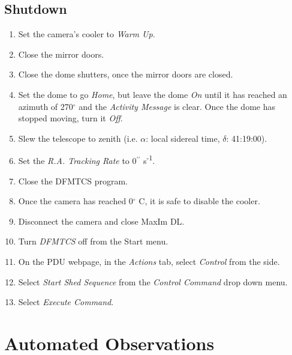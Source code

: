 \documentclass[letterpaper,12pt]{article}
\begin{document}
	\subsection{Shutdown}
	\begin{enumerate}
	\item Set the camera's  cooler to \textit{Warm Up}.
	\item Close the mirror doors.
	\item Close the dome shutters, once the mirror doors are closed.
	\item Set the dome to go \textit{Home}, but leave the dome \textit{On} until it has reached an azimuth of 270$^\circ$ and the \textit{Activity Message} is clear. Once the dome has stopped moving, turn it \textit{Off}.
	\item Slew the telescope to zenith (i.e. $\alpha$: local sidereal time, $\delta$: 41:19:00).
	\item Set the \textit{R.A. Tracking Rate} to 0$^{\prime\prime}$ s\textsuperscript{-1}.
	\item Close the DFMTCS program.
	\item Once the camera has reached 0$^\circ$ C, it is safe to disable the cooler.
	\item Disconnect the camera and close MaxIm DL.
	\item Turn \textit{DFMTCS} off from the Start menu.
	\item On the PDU webpage, in the \textit{Actions} tab, select \textit{Control} from the side.
	\item Select \textit{Start Shed Sequence} from the \textit{Control Command} drop down menu.
	\item Select \textit{Execute Command}.
	\end{enumerate}

\newpage
\section{Automated Observations}
\end{document}
